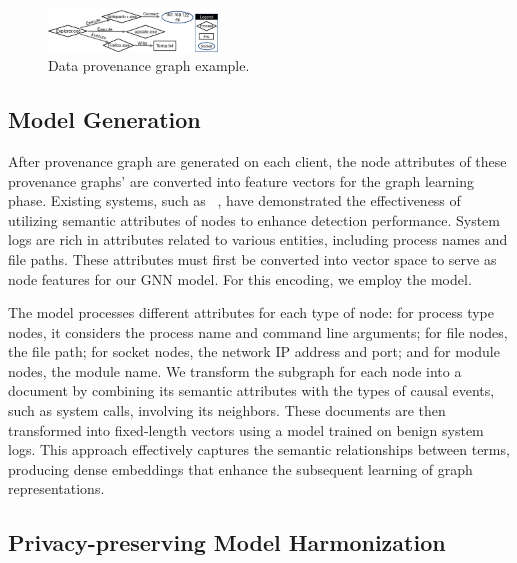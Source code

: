 \begin{figure}[t!]
  \centering
  \includegraphics[width=0.4\textwidth]{fig/provexp.pdf}
  \caption{Data provenance graph example.}
  \label{provexp}
  \vspace{-3ex}
\end{figure}


\subsection{\wordvec Model Generation}
\label{sub:word2vec:model}

After provenance graph are generated on each client, the node attributes of these provenance graphs' are converted into feature vectors for the graph learning phase. Existing systems, such as \flash~\cite{flash2024}, have demonstrated the effectiveness of utilizing semantic attributes of nodes to enhance detection performance. System logs are rich in attributes related to various entities, including process names and file paths. These attributes must first be converted into vector space to serve as node features for our GNN model. For this encoding, we employ the \wordvec model.



The \wordvec model processes different attributes for each type of node: for process type nodes, it considers the process name and command line arguments; for file nodes, the file path; for socket nodes, the network IP address and port; and for module nodes, the module name. We transform the subgraph for each node into a document by combining its semantic attributes with the types of causal events, such as system calls, involving its neighbors. These documents are then transformed into fixed-length vectors using a \wordvec model trained on benign system logs. This approach effectively captures the semantic relationships between terms, producing dense embeddings that enhance the subsequent learning of graph representations.


\subsection{Privacy-preserving \wordvec Model Harmonization}
\label{sub:model:harmonization}

